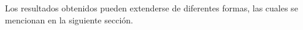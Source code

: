\documentclass[oneside,a4paper,spanish,links]{amca}
\begin{document}
Los resultados obtenidos pueden extenderse de diferentes formas, las
cuales se mencionan en la siguiente sección.













\end{document}
